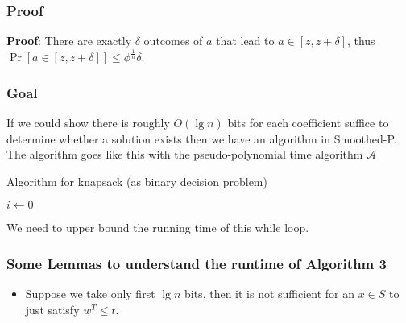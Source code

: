 \begin{frame}
    \frametitle{Proof}

    \textbf{Proof}: There are exactly $\delta$ outcomes of $a$ that lead to $a \in [z, z + \delta]$, thus
    $\Pr[a \in [z, z + \delta]] \leq \phi ^{\frac{1}{n}} \delta$.

\end{frame}

\begin{frame}
    \frametitle{Goal}

    If we could show there is roughly $O(\lg n)$ bits for each coefficient suffice
    to determine whether a solution exists then we have an algorithm in
    \textsf{Smoothed-P}. The algorithm goes like this with the pseudo-polynomial
    time algorithm $\mathcal{A}$

    \begin{algorithm}[H]
        \caption{Algorithm for knapsack (as binary decision problem)}

        $i \gets 0$\\

    \end{algorithm}

    We need to upper bound the running time of this while loop.

\end{frame}

\begin{frame}
    \frametitle{Some Lemmas to understand the runtime of Algorithm 3}

    \begin{itemize}
        \item Suppose we take only first $\lg n$ bits, then it is not sufficient for an $x
                  \in S$ to just satisfy $w^T \leq t$.
    \end{itemize}

\end{frame}

